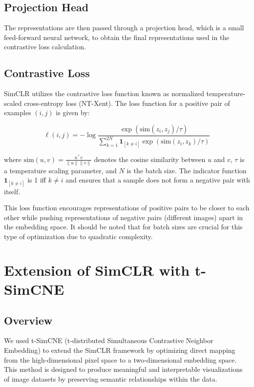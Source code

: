 \subsection{Projection Head}
The representations are then passed through a projection head, which is a small feed-forward neural network, to obtain the final representations used in the contrastive loss calculation.

\subsection{Contrastive Loss}
SimCLR utilizes the contrastive loss function known as normalized temperature-scaled cross-entropy loss (NT-Xent). The loss function for a positive pair of examples $(i, j)$ is given by:

\begin{equation}
\ell(i, j) = -\log \frac{\exp(\text{sim}(z_i, z_j) / \tau)}{\sum_{k=1}^{2N} \mathbf{1}_{[k \neq i]} \exp(\text{sim}(z_i, z_k) / \tau)}
\end{equation}

where $\text{sim}(u, v) = \frac{u^\top v}{\|u\| \|v\|}$ denotes the cosine similarity between $u$ and $v$, $\tau$ is a temperature scaling parameter, and $N$ is the batch size. The indicator function $\mathbf{1}_{[k \neq i]}$ is 1 iff $k \neq i$ and ensures that a sample does not form a negative pair with itself.

This loss function encourages representations of positive pairs to be closer to each other while pushing representations of negative pairs (different images) apart in the embedding space. It should be noted that for batch sizes are crucial for this type of optimization due to quadratic complexity.

\section{Extension of SimCLR with t-SimCNE}
\subsection{Overview}
We used t-SimCNE (t-distributed Simultaneous Contrastive Neighbor Embedding) to extend the SimCLR framework by optimizing direct mapping from the high-dimensional pixel space to a two-dimensional embedding space. This method is designed to produce meaningful and interpretable visualizations of image datasets by preserving semantic relationships within the data.

